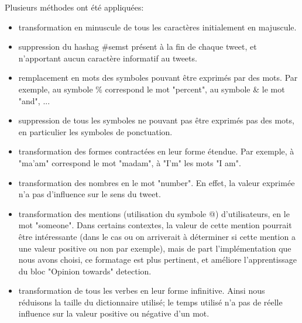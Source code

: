 \par Plusieurs méthodes ont été appliquées: 
\begin{itemize}
  \item transformation en minuscule de tous les caractères initialement en majuscule.
  \item suppression du hashag \#semst présent à la fin de chaque tweet, et n'apportant aucun caractère informatif au tweets.
  \item remplacement en mots des symboles pouvant être exprimés par des mots. Par exemple, au symbole \% correspond le mot "percent", au symbole \& le mot "and", ...
  \item suppression de tous les symboles ne pouvant pas être exprimés pas des mots, en particulier les symboles de ponctuation.
  \item transformation des formes contractées en leur forme étendue. Par exemple, à "ma'am" correspond le mot "madam", à "I'm" les mots "I am".
  \item transformation des nombres en le mot "number". En effet, la valeur exprimée n'a pas d'influence sur le sens du tweet.
  \item transformation des mentions (utilisation du symbole @) d'utilisateurs, en le mot "someone". Dans certains contextes, la valeur de cette mention pourrait être intéressante (dans le cas ou on arriverait à déterminer si cette mention a une valeur positive ou non par exemple), mais de part l'implémentation que nous avons choisi, ce formatage est plus pertinent, et améliore l'apprentissage du bloc "Opinion towards" detection.
  \item transformation de tous les verbes en leur forme infinitive. Ainsi nous réduisons la taille du dictionnaire utilisé; le temps utilisé n'a pas de réelle influence sur la valeur positive ou négative d'un mot.\\
\end{itemize}

